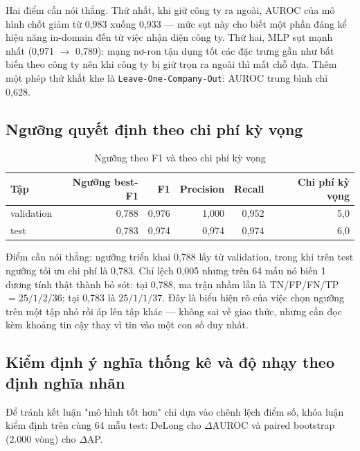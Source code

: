 Hai điểm cần nói thẳng. Thứ nhất, khi giữ công ty ra ngoài, AUROC của mô hình chốt giảm từ 0,983
xuống 0,933 — mức sụt này cho biết một phần đáng kể hiệu năng in-domain đến từ việc nhận diện công
ty. Thứ hai, MLP sụt mạnh nhất (0,971 $\rightarrow$ 0,789): mạng nơ-ron tận dụng tốt các đặc trưng
gần như bất biến theo công ty nên khi công ty bị giữ trọn ra ngoài thì mất chỗ dựa. Thêm một phép
thử khắt khe là \texttt{Leave-One-Company-Out}: AUROC trung bình chỉ 0,628.

\subsection{Ngưỡng quyết định theo chi phí kỳ vọng}

\begin{table}[H]
\centering
\caption{Ngưỡng theo F1 và theo chi phí kỳ vọng}
\label{tab:threshold}
\begin{tabular}{|l|r|r|r|r|r|}
\hline
\textbf{Tập} & \textbf{Ngưỡng best-F1} & \textbf{F1} & \textbf{Precision} & \textbf{Recall} &
\textbf{Chi phí kỳ vọng} \\
\hline
validation & 0,788 & 0,976 & 1,000 & 0,952 & 5,0 \\
test       & 0,783 & 0,974 & 0,974 & 0,974 & 6,0 \\
\hline
\end{tabular}
\end{table}

Điểm cần nói thẳng: ngưỡng triển khai 0,788 lấy từ validation, trong khi trên test ngưỡng tối ưu chi
phí là 0,783. Chỉ lệch 0,005 nhưng trên 64 mẫu nó biến 1 dương tính thật thành bỏ sót: tại 0,788,
ma trận nhầm lẫn là TN/FP/FN/TP $= 25/1/2/36$; tại 0,783 là $25/1/1/37$. Đây là biểu hiện rõ của việc
chọn ngưỡng trên một tập nhỏ rồi áp lên tập khác — không sai về giao thức, nhưng cần đọc kèm khoảng
tin cậy thay vì tin vào một con số duy nhất.

\subsection{Kiểm định ý nghĩa thống kê và độ nhạy theo định nghĩa nhãn}

Để tránh kết luận "mô hình tốt hơn" chỉ dựa vào chênh lệch điểm số, khóa luận kiểm định trên cùng 64
mẫu test: DeLong \cite{delong1988} cho $\Delta$AUROC và paired bootstrap (2.000 vòng) cho
$\Delta$AP.

